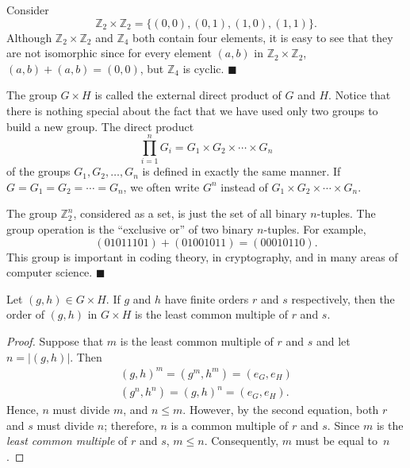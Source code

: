 \medskip

Consider
$$
{\mathbb Z}_2 \times {\mathbb Z}_2 = \{ (0, 0), (0, 1), (1, 0),(1, 1) \}.
$$
Although ${\mathbb Z}_2 \times {\mathbb Z}_2$ and ${\mathbb Z}_4$ both contain four elements, it is easy to see that they are not isomorphic since for every element $(a,b)$ in ${\mathbb Z}_2 \times {\mathbb Z}_2$, $(a,b) + (a,b) = (0,0)$, but ${\mathbb Z}_4$ is cyclic.
\hspace{\fill} $\blacksquare$

\medskip

The group $G \times H$ is called the {\bfi external direct product\/} of  $G$ and $H$. Notice that there is nothing special about the fact that we have used only two groups to build a new group. The direct product
$$
\prod_{i = 1}^n G_i = G_1 \times G_2 \times \cdots \times G_n
$$
of the groups $G_1, G_2, \ldots, G_n$ is defined in exactly the same manner. If $G = G_1 = G_2 = \cdots = G_n$, we often write $G^n$ instead of $G_1 \times G_2 \times \cdots \times G_n$.
 
\medskip

The group ${\mathbb Z}_2^n$, considered as a set, is just the set of all
binary $n$-tuples. The group operation is the ``exclusive or'' of two
binary $n$-tuples. For example, 
$$
(01011101) + (01001011) = (00010110).
$$
This group is important in coding theory, in cryptography, and in many
areas of computer science.  
\hspace{\fill} $\blacksquare$

 
\begin{theorem}
Let $(g, h) \in G \times H$. If $g$ and $h$ have finite orders $r$ and
$s$ respectively, then the order of $(g, h)$ in $G \times H$ is the
least common multiple of $r$ and $s$. 
\end{theorem}

 
\begin{proof}
Suppose that $m$ is the least common multiple of $r$ and $s$ and let
$n = |(g,h)|$. Then 
$$
\begin{array}{c}
(g,h)^m = (g^m, h^m) = (e_G,e_H) \\
(g^n, h^n) = (g, h)^n = (e_G,e_H).
\end{array}
$$
Hence, $n$ must divide $m$, and $n \leq m$.  However, by the second
equation, both $r$ and $s$ must divide $n$; therefore, $n$ is a common
multiple of $r$ and $s$. Since $m$ is the {\em least common multiple\/}
of $r$ and $s$, $m \leq n$.  Consequently, $m$ must be equal to~$n$.
\end{proof}
 

